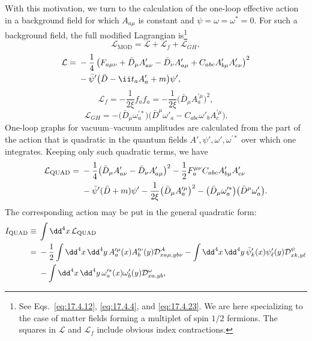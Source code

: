 With this motivation, we turn to the calculation of the one-loop effective
action in a background field for which $A_{a\mu}$ is constant and
$\psi=\omega=\omega^*=0$. For such a background field, the full modified
Lagrangian is\footnote{See Eqs.~\eqref{eq:17.4.12}, \eqref{eq:17.4.4}, and
\eqref{eq:17.4.23}. We are here specializing to the case of matter fields
forming a multiplet of spin $1/2$ fermions. The squares in $\mathcal L$ and
$\mathcal L_f$ include obvious index contractions.}
\begin{equation}
\mathcal L_{\mathrm{MOD}}=\mathcal L+\mathcal L_f+\mathcal L_{GH},
\label{eq:17.5.1}
\end{equation}
\begin{align}
\mathcal L={}&-\frac14\left(F_{a\mu\nu}+\bar D_\mu A'_{a\nu}
-\bar D_\nu A'_{a\mu}+C_{abc}A_{b\mu}'A_{c\nu}'\right)^2
\notag\\
&-\bar\psi'\bigl(\sl{\bar D}-\ii t_a\sl{A}'_a+m\bigr)\psi',
\label{eq:17.5.2}
\end{align}
\begin{equation}
\mathcal L_f=-\frac{1}{2\xi}f_a f_a
=-\frac{1}{2\xi}\bigl(\bar D_\mu A_a^{\prime\mu}\bigr)^2,
\label{eq:17.5.3}
\end{equation}
\begin{equation}
\mathcal L_{GH}=-\bigl(\bar D_\mu\omega_a^{\prime *}\bigr)
\bigl(\bar D^\mu\omega'_a
-C_{abc}\omega'_b A_c^{\prime\mu}\bigr).
\label{eq:17.5.4}
\end{equation}
One-loop graphs for vacuum--vacuum amplitudes are calculated from the
part of the action that is quadratic in the quantum fields
$A',\psi',\omega',\omega^{\prime *}$ over which one integrates. Keeping only
such quadratic terms, we have
\begin{align}
\mathcal L_{\mathrm{QUAD}}={}&-\frac14
\bigl(\bar D_\mu A'_{a\nu}-\bar D_\nu A'_{a\mu}\bigr)^2
-\frac12F_a^{\mu\nu}C_{abc}
A'_{b\mu}A'_{c\nu}
\notag\\
&-\bar\psi'(\sl{\bar D}+m)\psi'
-\frac{1}{2\xi}\bigl(\bar D_\mu A_a^{\prime\mu}\bigr)^2
-\bigl(\bar D_\mu\omega_a^{\prime *}\bigr)
 \bigl(\bar D^\mu\omega'_a\bigr).
\label{eq:17.5.5}
\end{align}
The corresponding action may be put in the general quadratic form:
\begin{align}
I_{\mathrm{QUAD}}\equiv{}&\int \dd^4x\,\mathcal L_{\mathrm{QUAD}}
\notag\\
={}&-\frac12\int \dd^4x\,\dd^4y\,
A_a^{\prime\mu}(x)A_b^{\prime\nu}(y)
\mathcal D^A_{xa\mu,yb\nu}
-\int \dd^4x\,\dd^4y\,\bar\psi'_k(x)\psi'_\ell(y)
\mathcal D^\psi_{xk,y\ell}
\notag\\
&-\int \dd^4x\,\dd^4y\,\omega_a^{\prime *}(x)\omega'_b(y)
\mathcal D^\omega_{xa,yb},
\label{eq:17.5.6}
\end{align}
